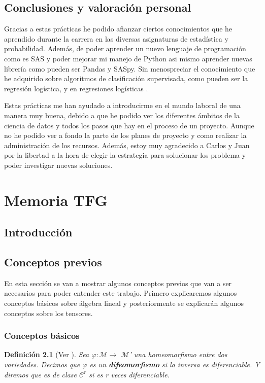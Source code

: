 \documentclass[pdftex,11pt,a4paper]{book}
\newtheorem{defi}{Definici\'on}
\newcommand{\M}{$\mathscr{M}$}
\begin{document}
\section{Conclusiones y valoración personal}
Gracias a estas prácticas he podido afianzar ciertos conocimientos que he aprendido durante la carrera en las diversas asignaturas de estadística y probabilidad. Además, de poder aprender un nuevo lenguaje de programación como es SAS y poder mejorar mi manejo de Python  asi mismo aprender nuevas librería como pueden ser Pandas y SASpy. Sin menospreciar el conocimiento que he adquirido sobre algoritmos de clasificación supervisada, como pueden ser la regresión logística, y en regresiones logísticas . 

Estas prácticas me han ayudado a introducirme en el mundo laboral de una manera muy buena, debido a que he podido ver los diferentes ámbitos de la ciencia de datos y todos los pasos que hay en el proceso de un proyecto. Aunque no he podido ver a fondo la parte de los planes de proyecto y como realizar la administración de los recursos. 
Además, estoy muy agradecido a Carlos y Juan por la libertad a la hora de  elegir la estrategia para solucionar los problema y poder investigar nuevas soluciones.

\chapter{Memoria TFG}

\section {Introducción}



\section{Conceptos previos}

En esta sección se van a mostrar algunos conceptos previos que van a ser necesarios para poder entender este trabajo. Primero explicaremos algunos conceptos básicos sobre álgebra lineal y posteriormente  se explicarán algunos conceptos sobre los tensores. 

\subsection{Conceptos básicos}
\begin{defi}[Ver \cite{Fomenko}]
Sea $\varphi:$\M $\to$ \M' una homeomorfismo entre dos variedades. Decimos que $\varphi$ es un \textbf{difeomorfismo} si la inversa es diferenciable. Y diremos que es de clase $\mathscr{C}^r$ si es r veces diferenciable. 
\end{defi}
\end{document}

